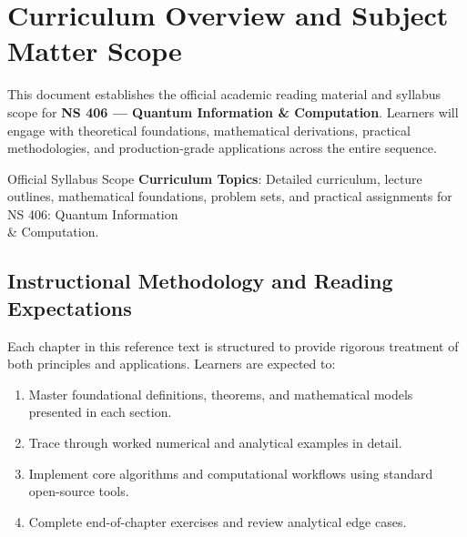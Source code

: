 \section{Curriculum Overview and Subject Matter Scope}

This document establishes the official academic reading material and syllabus scope for \textbf{NS 406 --- Quantum Information \& Computation}. Learners will engage with theoretical foundations, mathematical derivations, practical methodologies, and production-grade applications across the entire sequence.

\begin{InsightBox}{Official Syllabus Scope}
  \textbf{Curriculum Topics}: Detailed curriculum, lecture outlines, mathematical foundations, problem sets, and practical assignments for NS 406: Quantum Information \\& Computation.
\end{InsightBox}

\subsection{Instructional Methodology and Reading Expectations}

Each chapter in this reference text is structured to provide rigorous treatment of both principles and applications. Learners are expected to:
\begin{enumerate}
  \item Master foundational definitions, theorems, and mathematical models presented in each section.
  \item Trace through worked numerical and analytical examples in detail.
  \item Implement core algorithms and computational workflows using standard open-source tools.
  \item Complete end-of-chapter exercises and review analytical edge cases.
\end{enumerate}

